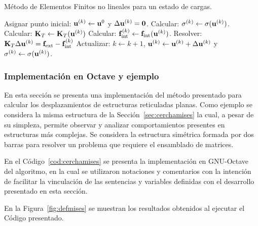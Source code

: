 \begin{algorithm}
	\caption{Método de Elementos Finitos no lineales para un estado de cargas.}
	\label{alg:mefnl1carga}
	\begin{algorithmic}[1]
		\STATE Asignar punto inicial: ${\bf u}^{(k)} \leftarrow {\bf u}^0$ y $\Delta {\bf u}^{(k)} = \boldsymbol{0}$.
		\STATE Calcular: $\sigma^{(k)} \leftarrow \sigma({\bf u}^{(k)})$.
		\STATE Calcular: ${\bf K}_T \leftarrow {\bf K}_T({\bf u}^{(k)} )$
		\STATE Calcular: ${\bf f}_{\text{int}}^{(k)} \leftarrow {\bf f}_{\text{int}}({\bf u}^{(k)} )$.
		\STATE Resolver: ${\bf K}_T \Delta {\bf u}^{(k)} = {\bf f}_{\text{ext}} - {\bf f}_{\text{int}}^{(k)}$
		\STATE Actualizar: $k \leftarrow k + 1$, ${\bf u}^{(k)} \leftarrow {\bf u}^{(k)} + \Delta {\bf u}^{(k)}$ y $\sigma^{(k)} \leftarrow \sigma({\bf u}^{(k)})$.
		\ENDWHILE
	\end{algorithmic}
\end{algorithm}



\subsubsection{Implementación en Octave y ejemplo}\label{sec:implem}

En esta sección se presenta una implementación del método presentado para calcular los desplazamientos de estructuras reticuladas planas. %
%
Como ejemplo se considera la misma estructura de la Sección~\ref{sec:cerchamises} la cual, a pesar de su simpleza, permite observar y analizar comportamientos presentes en estructuras más complejas. %
%
Se considera la estructura simétrica formada por dos barras para resolver un problema que requiere el ensamblado de matrices. %


En el Código~\ref{cod:cerchamises} se presenta la implementación en GNU-Octave del algoritmo, en la cual se utilizaron notaciones y comentarios con la intención de facilitar la vinculación de las sentencias y variables definidas con el desarrollo presentado en esta sección. %



En la Figura~\ref{fig:defmises} se muestran los resultados obtenidos al ejecutar el Código presentado. %



